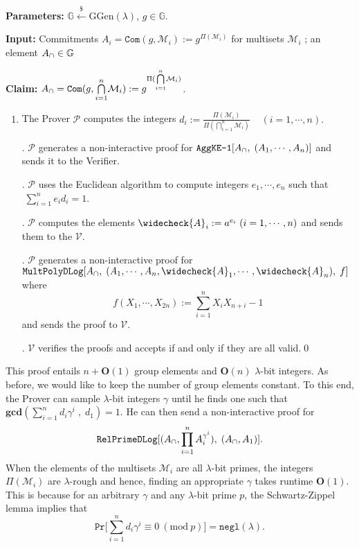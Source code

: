 \documentclass[11pt, lettersize, notitlepage, leqno, footskip=0.6cm]{article}
\newcommand{\pl}{\prod\limits}
\newcommand{\slim}{\sum\limits}
\newcommand{\ttt}{\texttt}
\newcommand{\negl}{\ttt{{negl}}}
\newcommand{\mc}{\mathcal}
\newcommand{\mb}{\mathbb}
\newcommand{\mbf}{\mathbf}
\newcommand{\mr}{\mathrm}
\newcommand{\lam}{\lambda}
\newcommand{\lamb}{\lambda}
\newcommand{\weck}{\widecheck}
\newcommand{\bO}{\mbf{O}}
\newcommand{\mP}{\mc{P}}
\newcommand{\V}{\mc{V}}
\newcommand{\mcM}{\mc{M}}
\newcommand{\vs}{\vspace{-0.15cm}}
\newcommand{\noin}{\noindent}
\newcommand{\Mod}[1]{\ (\mathrm{mod}\ #1)}
\newcommand{\GCD}{\mbf{gcd}}
\numberwithin{equation}{section}
\begin{document}
\noin \textbf{Parameters:} $\mb{G}\xleftarrow{\$} \mr{GGen}(\lamb)$,\; $g\in \mb{G}$.

\noin \textbf{Input:} Commitments $A_i = \ttt{Com}(g, \mcM_i) := g^{\Pi(\mc{M}_i)}$ for multisets $\mc{M}_i$ ; an element $A_{\tt{\cap}}\in\mb{G}$

\noin \textbf{Claim:} $A_{\tt{\cap}} = \protect{\verb|Com|}(g, {\bigcap\limits_{i=1}^n} \mc{M}_i) := g^{\Pi({\bigcap\limits_{i=1}^n} \mc{M}_i)}$.

\begin{enumerate}[wide, labelwidth=!, labelindent=0pt]\vs \item The Prover $\mP$ computes the integers $d_i:= \frac{\Pi(\mc{M}_i)}{\Pi({\bigcap\limits_{i=1}^n} \mc{M}_i)}\;\;\;\; (i=1,\cdots,n).$

\noin 2. $\mP$ generates a non-interactive proof for $\ttt{AggKE-1}[A_{\tt{\cap}},\;(A_1,\cdots,A_n)]$ and sends it to the Verifier.

\noin 3. $\mP$ uses the Euclidean algorithm to compute integers $e_1,\cdots,e_n$ such that $\;\sum_{i=1}^n e_id_i = 1$.

\noin 4. $\mP$ computes the elements $\weck{A}_i := a^{e_i}\; (i=1,\cdots,n)$ and sends them to the $\V$.

\noin 5. $\mP$ generates a non-interactive proof for $\ttt{MultPolyDLog}[A_{\tt{\cap}},\; (A_1,\cdots,A_n, \weck{A}_1,\cdots,\weck{A}_n),\;f]$ where \vs $$f(X_1,\cdots,X_{2n}):= \slim_{i=1}^n X_iX_{n+i} - 1 $$ and sends the proof to $\V$.

\noin 6. $\V$ verifies the proofs and accepts if and only if they are all valid.\qed \end{enumerate}

This proof entails $n+\bO(1)$ group elements and $\bO(n)$ $\lam$-bit integers. As before, we would like to keep the number of group elements constant. To this end, the Prover can sample $\lam$-bit integers $\gamma$ until he finds one such that $\GCD(\sum_{i=1}^n d_i\gamma^i\;,\; d_1) = 1 .$ He can then send a non-interactive proof for \vs $$\ttt{RelPrimeDLog}[(A_{\tt{\cap}},\pl_{i=1}^n A_i^{\gamma^i}),\;(A_{\tt{\cap}}, A_1)].$$ When the elements of the multisets $\mc{M}_i$ are all $\lam$-bit primes, the integers $\Pi(\mcM_i)$ are $\lam$-rough and hence, finding an appropriate $\gamma$ takes runtime $\bO(1)$. This is because for an arbitrary $\gamma$ and any $\lam$-bit prime $p$, the Schwartz-Zippel lemma implies that \vs $$\ttt{Pr}\Big[\slim_{i=1}^n d_i\gamma^i \equiv 0\Mod{p} \Big] = \negl(\lam). $$ 
\end{document}
